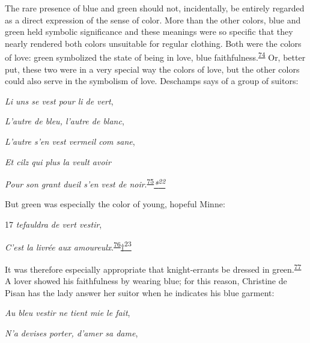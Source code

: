 The rare presence of blue and green should not, incidentally, be
entirely regarded as a direct expression of the sense of color. More
than the other colors, blue and green held symbolic significance and
these meanings were so specific that they nearly rendered both colors
unsuitable for regular clothing. Both were the colors of love: green
symbolized the state of being in love, blue
faithfulness.\textsuperscript{\protect\hypertarget{20_ILLUSTRATIONS_FOLLOW_PAGE.xhtmlux5cux23id_326}{\protect\hyperlink{23_NOTES.xhtmlux5cux23id_327}{74}}}
Or, better put, these two were in a very special way the colors of love,
but the other colors could also serve in the symbolism of love.
Deschamps says of a group of suitors:

\emph{Li uns se vest pour li de vert},

\emph{L'autre de bleu, l'autre de blanc},

\emph{L'autre s'en vest vermeil com sane},

\emph{Et cilz qui plus la veult avoir}

\emph{Pour son grant dueil s'en vest de
noir}.\textsuperscript{\protect\hypertarget{20_ILLUSTRATIONS_FOLLOW_PAGE.xhtmlux5cux23id_324}{\protect\hyperlink{23_NOTES.xhtmlux5cux23id_325}{75}}}\emph{\protect\hypertarget{20_ILLUSTRATIONS_FOLLOW_PAGE.xhtmlux5cux23id_2693}{\protect\hyperlink{23_NOTES.xhtmlux5cux23id_2694}{*\textsuperscript{22}}}}

But green was especially the color of young, hopeful Minne:

17 \emph{tefauldra de vert vestir},

\emph{C'est la livrée aux
amoureulx}.\textsuperscript{\protect\hypertarget{20_ILLUSTRATIONS_FOLLOW_PAGE.xhtmlux5cux23id_322}{\protect\hyperlink{23_NOTES.xhtmlux5cux23id_323}{76}}}\protect\hypertarget{20_ILLUSTRATIONS_FOLLOW_PAGE.xhtmlux5cux23id_2695}{\protect\hyperlink{23_NOTES.xhtmlux5cux23id_2696}{†\textsuperscript{23}}}

It was therefore especially appropriate that knight-errants be dressed
in
green.\textsuperscript{\protect\hypertarget{20_ILLUSTRATIONS_FOLLOW_PAGE.xhtmlux5cux23id_320}{\protect\hyperlink{23_NOTES.xhtmlux5cux23id_321}{77}}}
A lover showed his faithfulness by wearing blue; for this reason,
Christine de Pisan has the lady answer her suitor when he indicates his
blue garment:

\emph{\protect\hypertarget{20_ILLUSTRATIONS_FOLLOW_PAGE.xhtmlux5cux23page_327}{}{}Au
bleu vestir ne tient mie le fait},

\emph{N'a devises porter, d'amer sa dame},

